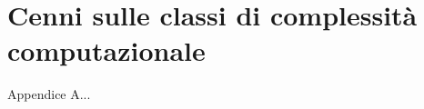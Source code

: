 \appendix
{}
\chapter{Cenni sulle classi di complessità computazionale}
\label{chap:appA}
Appendice A...